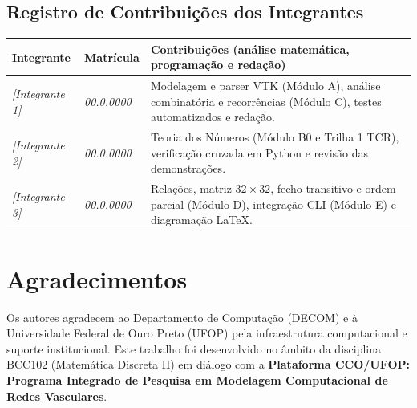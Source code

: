 \documentclass[11pt, a4paper]{article}
\begin{document}
\subsection*{Registro de Contribuições dos Integrantes}
\begin{table}[H]
  \centering
  \footnotesize
  \begin{tabularx}{\textwidth}{>{\raggedright\arraybackslash}p{3.6cm} >{\raggedright\arraybackslash}p{2.3cm} X}
    \toprule
    \textbf{Integrante} & \textbf{Matrícula} & \textbf{Contribuições (análise matemática, programação e redação)} \\
    \midrule
    \textit{[Integrante 1]} & \textit{00.0.0000} & Modelagem e parser VTK (Módulo A), análise combinatória e recorrências (Módulo C), testes automatizados e redação. \\
    \textit{[Integrante 2]} & \textit{00.0.0000} & Teoria dos Números (Módulo B0 e Trilha 1 TCR), verificação cruzada em Python e revisão das demonstrações. \\
    \textit{[Integrante 3]} & \textit{00.0.0000} & Relações, matriz $32\times 32$, fecho transitivo e ordem parcial (Módulo D), integração CLI (Módulo E) e diagramação \LaTeX. \\
    \bottomrule
  \end{tabularx}
\end{table}

\section*{Agradecimentos}
Os autores agradecem ao Departamento de Computação (DECOM) e à Universidade Federal de Ouro Preto (UFOP) pela infraestrutura computacional e suporte institucional. Este trabalho foi desenvolvido no âmbito da disciplina BCC102 (Matemática Discreta II) em diálogo com a \textbf{Plataforma CCO/UFOP: Programa Integrado de Pesquisa em Modelagem Computacional de Redes Vasculares}.
\end{document}

